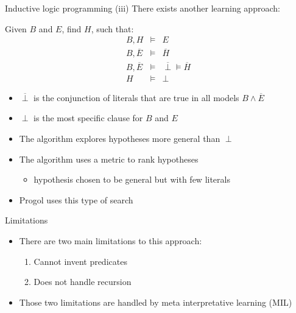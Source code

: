 \begin{frame}{Inductive logic programming (iii)}
\vfill
There exists another learning approach:
\vfill
\begin{center}
    Given $B$ and $E$, find $H$, such that:
    \begin{eqnarray*}
    B, H &\models& E \\
    B, \overline{E} &\models& \overline{H} \\
    B, \overline{E} &\models& \overline{\perp} \models \overline{H}\\
    H &\models& \perp
    \end{eqnarray*}  
\end{center}
\vfill
\begin{itemize}
    \item $\overline{\perp}$ is the conjunction of literals that are true in all models $B \wedge \overline{E}$
    \item $\perp$ is the most specific clause for $B$ and $E$
    \item The algorithm explores hypotheses more general than $\perp$
    \item The algorithm uses a metric to rank hypotheses
    \begin{itemize}
        \item[\ding{43}] hypothesis chosen to be general but with few literals
    \end{itemize}
    \item Progol uses this type of search
\end{itemize}
\vfill
\end{frame}

\begin{frame}{Limitations}
\vfill
\begin{itemize}
    \item There are two main limitations to this approach:
\begin{enumerate}
    \item Cannot invent predicates
    \item Does not handle recursion
\end{enumerate}
\vfill    
\item Those two limitations are handled by meta interpretative learning (MIL)
\vfill
\end{itemize}
\end{frame}

